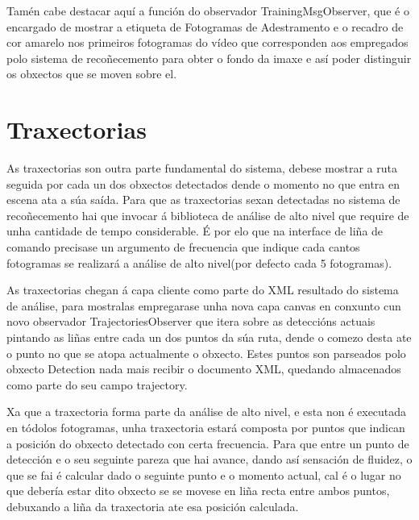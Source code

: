     Tamén cabe destacar aquí a función do observador TrainingMsgObserver, que é o encargado de 
    mostrar a etiqueta de Fotogramas de Adestramento e o recadro de cor amarelo nos primeiros 
    fotogramas do vídeo que corresponden aos empregados polo sistema de recoñecemento para obter o 
    fondo da imaxe e así poder distinguir os obxectos que se moven sobre el.
    
\section{Traxectorias}

    As traxectorias son outra parte fundamental do sistema, debese mostrar a ruta seguida por 
    cada un dos obxectos detectados dende o momento no que entra en escena ata a súa saída. Para 
    que as traxectorias sexan detectadas no sistema de recoñecemento hai que invocar á biblioteca 
    de análise de alto nivel que require de unha cantidade de tempo considerable. É por elo que na 
    interface de liña de comando precisase un argumento de frecuencia que indique cada cantos 
    fotogramas se realizará a análise de alto nivel(por defecto cada 5 fotogramas).
    
    As traxectorias chegan á capa cliente como parte do XML resultado do sistema de análise, para 
    mostralas empregarase unha nova capa canvas en conxunto cun novo observador 
    TrajectoriesObserver que itera sobre as deteccións actuais pintando as liñas entre cada un dos
    puntos da súa ruta, dende o comezo desta ate o punto no que se atopa actualmente o obxecto. 
    Estes puntos son parseados polo obxecto Detection nada mais recibir o documento XML, quedando
    almacenados como parte do seu campo trajectory.
    
    Xa que a traxectoria forma parte da análise de alto nivel, e esta 
    non é executada en tódolos fotogramas, unha traxectoria estará composta por puntos que indican a
    posición do obxecto detectado con certa frecuencia. Para que entre un punto de detección e o seu
    seguinte pareza que hai avance, dando así sensación de fluidez, o que se fai é calcular dado o
    seguinte punto e o momento actual, cal é o lugar no que debería estar dito obxecto se se movese
    en liña recta entre ambos puntos, debuxando a liña da traxectoria ate esa posición calculada.
    
